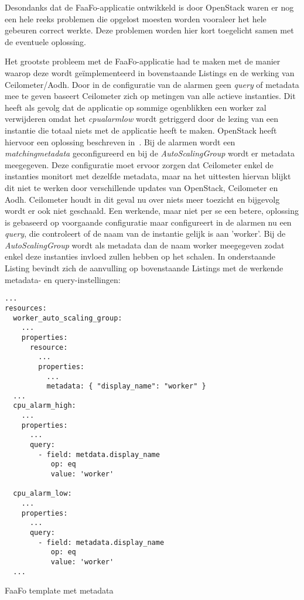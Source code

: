 Desondanks dat de FaaFo-applicatie ontwikkeld is door OpenStack waren er nog een hele reeks problemen die opgelost moesten worden vooraleer het hele gebeuren correct werkte. Deze problemen worden hier kort toegelicht samen met de eventuele oplossing.

Het grootste probleem met de FaaFo-applicatie had te maken met de manier waarop deze wordt geïmplementeerd in bovenstaande Listings en de werking van Ceilometer/Aodh. Door in de configuratie van de alarmen geen \textit{query} of metadata mee te geven baseert Ceilometer zich op metingen van alle actieve instanties. Dit heeft als gevolg dat de applicatie op sommige ogenblikken een worker zal verwijderen omdat het \textit{cpu\textunderscore alarm\textunderscore low} wordt getriggerd door de lezing van een instantie die totaal niets met de applicatie heeft te maken. OpenStack heeft hiervoor een oplossing beschreven in~\cite{OpenStack2017j}. Bij de alarmen wordt een \textit{matching\textunderscore metadata} geconfigureerd en bij de \textit{AutoScalingGroup} wordt er metadata meegegeven. Deze configuratie moet ervoor zorgen dat Ceilometer enkel de instanties monitort met dezelfde metadata, maar na het uittesten hiervan blijkt dit niet te werken door verschillende updates van OpenStack, Ceilometer en Aodh. Ceilometer houdt in dit geval nu over niets meer toezicht en bijgevolg wordt er ook niet geschaald. Een werkende, maar niet per se een betere, oplossing is gebaseerd op voorgaande configuratie maar configureert in de alarmen nu een \textit{query}, die controleert of de naam van de instantie gelijk is aan 'worker'. Bij de \textit{AutoScalingGroup} wordt als metadata dan de naam worker meegegeven zodat enkel deze instanties invloed zullen hebben op het schalen.
In onderstaande Listing bevindt zich de aanvulling op bovenstaande Listings met de werkende metadata- en query-instellingen:

\begin{code}
\begin{verbatim}
...
resources:
  worker_auto_scaling_group:
    ...
    properties:
      resource:
        ...
        properties:
          ...
          metadata: { "display_name": "worker" }
  ...
  cpu_alarm_high:
    ...
    properties:
      ...
      query:
        - field: metdata.display_name
           op: eq
           value: 'worker'

  cpu_alarm_low:
    ...
    properties:
      ...
      query:
        - field: metadata.display_name
           op: eq
           value: 'worker'
  ...
\end{verbatim}
\caption{FaaFo template met metadata}
\label{lst:faafo_add}
\end{code}

